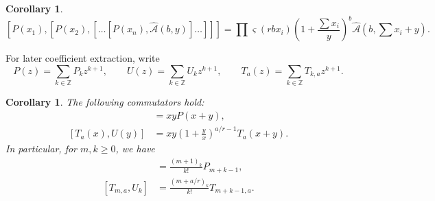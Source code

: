\documentclass[letterpaper,12pt]{amsart}
\newtheorem{cor}[thm]{Corollary}
\theoremstyle{definition}
\newcommand{\Z}{\mathbb Z}
\numberwithin{equation}{section}
\begin{document}
\begin{cor}\label{cor:multi-P-two-param-comm}
\[ 
  [P(x_1),[P(x_2),[\dots [P(x_n),\widehat {\mathcal{A}}(b,y)]\dots]]]
  =\prod\varsigma(rbx_i)
  \left(1+\frac{\sum x_i}{y}\right)^b \widehat{\mathcal{A}}(b,\sum x_i+y).
\]
\end{cor}

For later coefficient
extraction, write
\begin{equation*}
  P(z)=\sum_{k\in\Z}P_kz^{k+1},\qquad
  U(z)=\sum_{k\in\Z}U_kz^{k+1},\qquad
  T_a(z)=\sum_{k\in\Z}T_{k,a}z^{k+1}.
\end{equation*}

\begin{cor}\label{cor:P-U-T-U}
The following commutators hold:
\begin{align}
  [P(x),U(y)]&=xyP(x+y),\label{eq:P-U-comm}\\
  [T_a(x),U(y)]&=xy\left(1+\frac{y}{x}\right)^{a/r-1}T_a(x+y).\label{eq:T-U-comm}
\end{align}
In particular, for $m,k\geq 0$, we have
\begin{align}
  [P_m,U_k]&=\frac{(m+1)_k}{k!}P_{m+k-1},\label{eq:P-U-coeff}\\
  [T_{m,a},U_k]&=\frac{(m+a/r)_k}{k!}T_{m+k-1,a}.
\label{eq:T-U-modes}
\end{align}
\end{cor}
\end{document}
